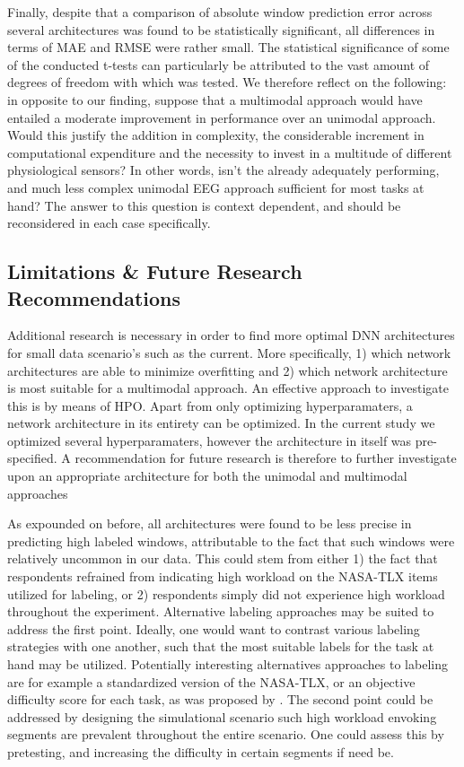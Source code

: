 \documentclass[fleqn,11pt]{paper}
\begin{document}
Finally, despite that a comparison of absolute window prediction error across several architectures was found to be statistically significant, all differences in terms of MAE and RMSE were rather small. The statistical significance of some of the conducted t-tests can particularly be attributed to the vast amount of degrees of freedom with which was tested. We therefore reflect on the following: in opposite to our finding, suppose that a multimodal approach would have entailed a moderate improvement in performance over an unimodal approach. Would this justify the addition in complexity,  the considerable increment in computational expenditure and the necessity to invest in a multitude of different physiological sensors? In other words, isn't the already adequately performing, and much less complex unimodal EEG approach sufficient for most tasks at hand? The answer to this question is context dependent, and should be reconsidered in each case specifically. 

\subsection{Limitations \& Future Research Recommendations}
Additional research is necessary in order to find more optimal DNN architectures for small data scenario's such as the current.  More specifically, 1) which network architectures are able to minimize overfitting and 2) which network architecture is most suitable for a multimodal approach. An effective approach to investigate this is by means of HPO. Apart from only optimizing hyperparamaters, a network architecture in its entirety can be optimized. In the current study we optimized several hyperparamaters, however the architecture in itself was pre-specified.  A recommendation for future research is therefore to further investigate upon an appropriate architecture for both the unimodal and multimodal approaches

As expounded on before, all architectures were found to be less precise in predicting high labeled windows, attributable to the fact that such windows were relatively uncommon in our data. This could stem from either 1) the fact that respondents refrained from indicating high workload on the NASA-TLX items utilized for labeling, or 2) respondents simply did not experience high workload throughout the experiment. Alternative labeling approaches may be suited to address the first point. Ideally, one would want to contrast various labeling strategies with one another, such that the most suitable labels for the task at hand may be utilized. Potentially interesting alternatives approaches to labeling are for example a standardized version of the NASA-TLX, or an objective difficulty score for each task, as was proposed by . The second point could be addressed by designing the simulational scenario such high workload envoking segments are prevalent throughout the entire scenario. One could assess this by pretesting, and increasing the difficulty in certain segments if need be. 
\end{document}
